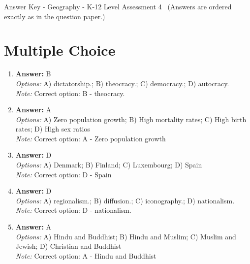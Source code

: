 \documentclass[12pt]{article}
\begin{document}
\begin{center}
Answer Key - Geography - K-12 Level Assessment 4 \
\small (Answers are ordered exactly as in the question paper.)
\end{center}

\section*{Multiple Choice}
\begin{enumerate}[label=\arabic*.]
\item \textbf{Answer:} B
\\ \textit{Options:} A) dictatorship.; B) theocracy.; C) democracy.; D) autocracy.
\\ \textit{Note:} Correct option: B - theocracy.
\item \textbf{Answer:} A
\\ \textit{Options:} A) Zero population growth; B) High mortality rates; C) High birth rates; D) High sex ratios
\\ \textit{Note:} Correct option: A - Zero population growth
\item \textbf{Answer:} D
\\ \textit{Options:} A) Denmark; B) Finland; C) Luxembourg; D) Spain
\\ \textit{Note:} Correct option: D - Spain
\item \textbf{Answer:} D
\\ \textit{Options:} A) regionalism.; B) diffusion.; C) iconography.; D) nationalism.
\\ \textit{Note:} Correct option: D - nationalism.
\item \textbf{Answer:} A
\\ \textit{Options:} A) Hindu and Buddhist; B) Hindu and Muslim; C) Muslim and Jewish; D) Christian and Buddhist
\\ \textit{Note:} Correct option: A - Hindu and Buddhist
\end{enumerate}
\end{document}

